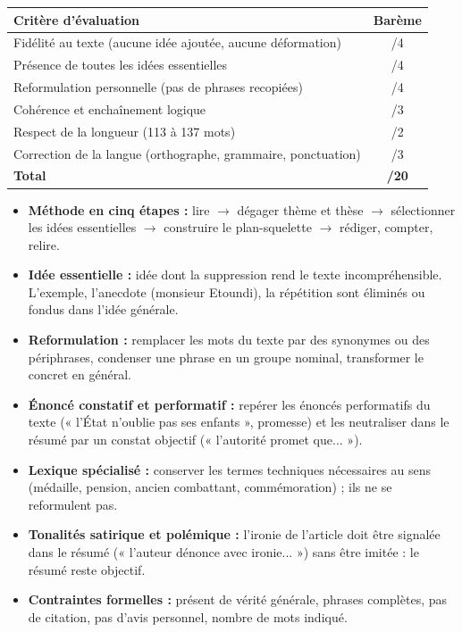 \documentclass[11pt]{article}
\newcounter{popsec}
\newcounter{popsub}
\newcommand{\courssub}[1]{%
  \stepcounter{popsub}%
  \par\vspace{9pt}\noindent{\popxbold\fontsize{11.5}{13}\selectfont\color{popink}{\color{poporange}\thepopsec.\thepopsub}\hspace{6pt}#1}\par\nopagebreak\vspace{4pt}
}
\begin{document}
\begin{center}
\begin{tabularx}{\linewidth}{|X|c|}
\hline
\rowcolor{popblueL} \textbf{Critère d'évaluation} & \textbf{Barème} \\
\hline
Fidélité au texte (aucune idée ajoutée, aucune déformation) & /4 \\
\hline
Présence de toutes les idées essentielles & /4 \\
\hline
Reformulation personnelle (pas de phrases recopiées) & /4 \\
\hline
Cohérence et enchaînement logique & /3 \\
\hline
Respect de la longueur (113 à 137 mots) & /2 \\
\hline
Correction de la langue (orthographe, grammaire, ponctuation) & /3 \\
\hline
\textbf{Total} & \textbf{/20} \\
\hline
\end{tabularx}
\end{center}

\courssub{Ressources à mobiliser}

\begin{aretenir}
\begin{itemize}
\item \textbf{Méthode en cinq étapes :} lire $\rightarrow$ dégager thème et thèse $\rightarrow$ sélectionner les idées essentielles $\rightarrow$ construire le plan-squelette $\rightarrow$ rédiger, compter, relire.
\item \textbf{Idée essentielle :} idée dont la suppression rend le texte incompréhensible. L'exemple, l'anecdote (monsieur Etoundi), la répétition sont éliminés ou fondus dans l'idée générale.
\item \textbf{Reformulation :} remplacer les mots du texte par des synonymes ou des périphrases, condenser une phrase en un groupe nominal, transformer le concret en général.
\item \textbf{Énoncé constatif et performatif :} repérer les énoncés performatifs du texte (« l'État n'oublie pas ses enfants », promesse) et les neutraliser dans le résumé par un constat objectif (« l'autorité promet que... »).
\item \textbf{Lexique spécialisé :} conserver les termes techniques nécessaires au sens (médaille, pension, ancien combattant, commémoration) ; ils ne se reformulent pas.
\item \textbf{Tonalités satirique et polémique :} l'ironie de l'article doit être signalée dans le résumé (« l'auteur dénonce avec ironie... ») sans être imitée : le résumé reste objectif.
\item \textbf{Contraintes formelles :} présent de vérité générale, phrases complètes, pas de citation, pas d'avis personnel, nombre de mots indiqué.
\end{itemize}
\end{aretenir}
\end{document}
